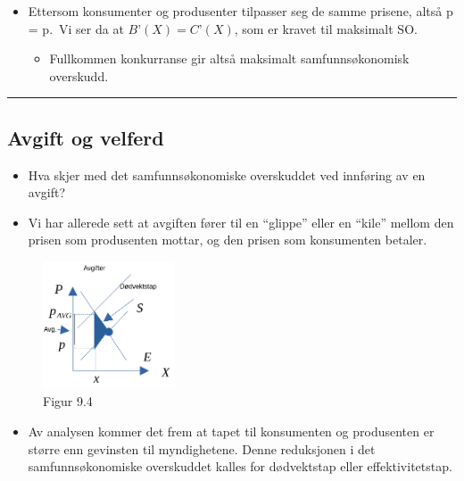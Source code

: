 \documentclass[
  letterpaper,
  DIV=11,
  numbers=noendperiod]{scrartcl}
\providecommand{\tightlist}{%
  \setlength{\itemsep}{0pt}\setlength{\parskip}{0pt}}\usepackage{longtable,booktabs,array}
\begin{document}
\begin{itemize}
\tightlist
\item
  Ettersom konsumenter og produsenter tilpasser seg de samme prisene,
  altså p = p.~Vi ser da at \(B’(X) = C’(X)\), som er kravet til
  maksimalt SO.

  \begin{itemize}
  \tightlist
  \item
    Fullkommen konkurranse gir altså maksimalt samfunnsøkonomisk
    overskudd.
  \end{itemize}
\end{itemize}

\begin{center}\rule{0.5\linewidth}{0.5pt}\end{center}

\subsection{Avgift og velferd}\label{avgift-og-velferd}

\begin{itemize}
\tightlist
\item
  Hva skjer med det samfunnsøkonomiske overskuddet ved innføring av en
  avgift?
\item
  Vi har allerede sett at avgiften fører til en ``glippe'' eller en
  ``kile'' mellom den prisen som produsenten mottar, og den prisen som
  konsumenten betaler.
\end{itemize}

\begin{figure}[H]

{\centering \includegraphics[width=0.35\textwidth,height=\textheight]{drawio/avgfk.png}

}

\caption{Figur 9.4}

\end{figure}%

\begin{itemize}
\tightlist
\item
  Av analysen kommer det frem at tapet til konsumenten og produsenten er
  større enn gevinsten til myndighetene. Denne reduksjonen i det
  samfunnsøkonomiske overskuddet kalles for dødvektstap eller
  effektivitetstap.
\end{itemize}
\end{document}
